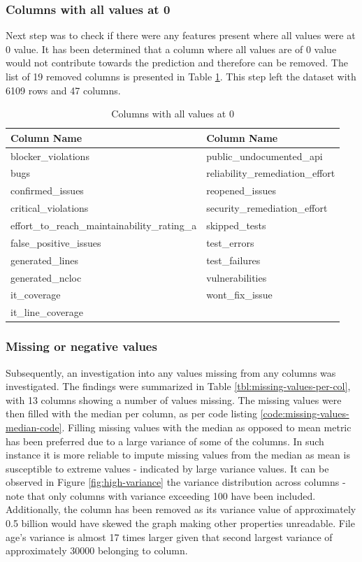 \subsubsection{Columns with all values at 0}\label{sec:impl-data-analysis:all-cols-at-0}
Next step was to check if there were any features present where all values were at 0 value. It has been determined that a column where all values are of 0 value would not contribute towards the prediction and therefore can be removed. The list of 19 removed columns is presented in Table \ref{tbl:zero-value-columns}. This step left the dataset with 6109 rows and 47 columns.

\begin{table}[h!]
\centering
\caption{Columns with all values at 0}
\label{tbl:zero-value-columns}
\begin{tabular}{@{}ll@{}}
\toprule
Column Name & Column Name \\ \midrule
blocker\_violations & public\_undocumented\_api \\
bugs & reliability\_remediation\_effort \\
confirmed\_issues & reopened\_issues \\
critical\_violations & security\_remediation\_effort \\
effort\_to\_reach\_maintainability\_rating\_a & skipped\_tests \\
false\_positive\_issues & test\_errors \\
generated\_lines & test\_failures \\
generated\_ncloc & vulnerabilities \\
it\_coverage & wont\_fix\_issue \\
it\_line\_coverage &  \\ \bottomrule
\end{tabular}
\end{table}



\subsubsection{Missing or negative values}\label{sec:impl-data-analysis:missing-or-negative-values}
Subsequently, an investigation into any values missing from any columns was investigated. The findings were summarized in Table \ref{tbl:missing-values-per-col}, with 13 columns showing a number of values missing. The missing values were then filled with the median per column, as per code listing \ref{code:missing-values-median-code}. Filling missing values with the median as opposed to mean metric has been preferred due to a large variance of some of the columns. In such instance it is more reliable to impute missing values from the median as mean is susceptible to extreme values - indicated by large variance values. It can be observed in Figure \ref{fig:high-variance} the variance distribution across columns - note that only columns with variance exceeding 100 have been included. Additionally, the \fileAgeInSec{} column has been removed as its variance value of approximately 0.5 billion would have skewed the graph making other properties unreadable. File age's variance is almost 17 times larger given that second largest variance of approximately 30000 belonging to \lines{} column.

